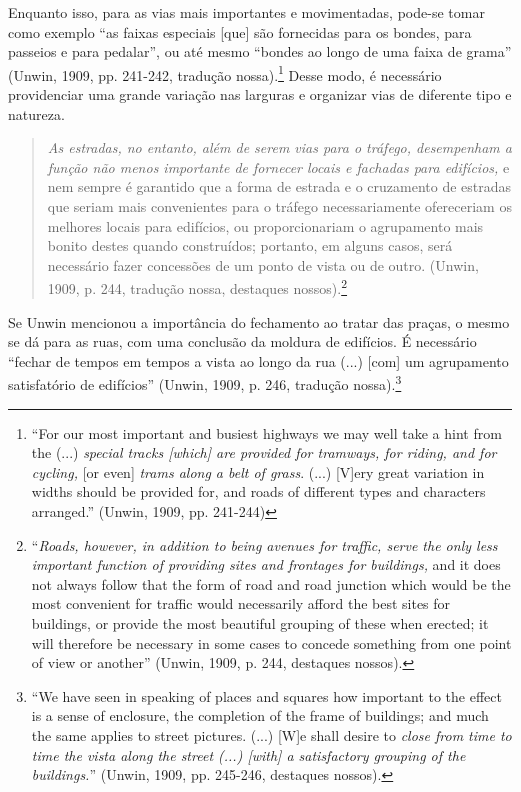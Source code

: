 \documentclass[12pt, a4paper]{book} %
\begin{document}
        Enquanto isso, para as vias mais importantes e movimentadas, pode-se tomar como exemplo ``as faixas especiais [que] são fornecidas para os bondes, para passeios e para pedalar'', ou até mesmo ``bondes ao longo de uma faixa de grama'' (Unwin, 1909, pp. 241-242, tradução nossa).\footnote[77]{``For our most important and busiest highways we may well take a hint from the (...) \textit{special tracks [which] are provided for tramways, for riding, and for cycling,} [or even] \textit{trams along a belt of grass}. (...) [V]ery great variation in widths should be provided for, and roads of different types and characters arranged.'' (Unwin, 1909, pp. 241-244)} Desse modo, é necessário providenciar uma grande variação nas larguras e organizar vias de diferente tipo e natureza.

        \begin{quotation}
            \textit{As estradas, no entanto, além de serem vias para o tráfego, desempenham a função não menos importante de fornecer locais e fachadas para edifícios,} e nem sempre é garantido que a forma de estrada e o cruzamento de estradas que seriam mais convenientes para o tráfego necessariamente ofereceriam os melhores locais para edifícios, ou proporcionariam o agrupamento mais bonito destes quando construídos; portanto, em alguns casos, será necessário fazer concessões de um ponto de vista ou de outro. (Unwin, 1909, p. 244, tradução nossa, destaques nossos).\footnote[78]{``\textit{Roads, however, in addition to being avenues for traffic, serve the only less important function of providing sites and frontages for buildings,} and it does not always follow that the form of road and road junction which would be the most convenient for traffic would necessarily afford the best sites for buildings, or provide the most beautiful grouping of these when erected; it will therefore be necessary in some cases to concede something from one point of view or another'' (Unwin, 1909, p. 244, destaques nossos).}
        \end{quotation}
        
        Se Unwin mencionou a importância do fechamento ao tratar das praças, o mesmo se dá para as ruas, com uma conclusão da moldura de edifícios. É necessário ``fechar de tempos em tempos a vista ao longo da rua (...) [com] um agrupamento satisfatório de edifícios'' (Unwin, 1909, p. 246, tradução nossa).\footnote[79]{``We have seen in speaking of places and squares how important to the effect is a sense of enclosure, the completion of the frame of buildings; and much the same applies to street pictures. (...) [W]e shall desire to \textit{close from time to time the vista along the street (...) [with] a satisfactory grouping of the buildings.}'' (Unwin, 1909, pp. 245-246, destaques nossos).}
\end{document}
